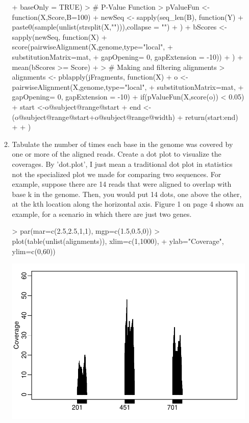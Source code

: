\documentclass[12pt,a4paper]{paper}
\begin{document}
\begin{enumerate}
\begin{enumerate}
\begin{Schunk}
\begin{Sinput}
+                                     baseOnly = TRUE)
> # P-Value Function
> pValueFun <- function(X,Score,B=100){
+   newSeq <- sapply(seq_len(B), function(Y){
+     paste0(sample(unlist(strsplit(X,""))),collapse = "")
+   })
+   bScores <- sapply(newSeq, function(X){
+     score(pairwiseAlignment(X,genome,type="local",
+                             substitutionMatrix=mat,
+                             gapOpening= 0, gapExtension = -10))
+   })
+   mean(bScores >= Score)
+ }
> # Making and filtering alignments
> alignments <- pblapply(jFragments, function(X){
+   o <- pairwiseAlignment(X,genome,type="local",
+                             substitutionMatrix=mat,
+                             gapOpening= 0, gapExtension = -10)
+   if(pValueFun(X,score(o)) < 0.05){
+     start <-o@subject@range@start
+     end <- (o@subject@range@start+o@subject@range@width)
+     return(start:end)
+   }
+ })
\end{Sinput}
\end{Schunk}
\item Tabulate the number of times each base in the genome was covered by one or more of
the aligned reads. Create a dot plot to visualize the coverages. By 'dot.plot', I just
mean a traditional dot plot in statistics not the specialized plot we made for comparing
two sequences. For example, suppose there are 14 reads that were aligned to overlap
with base k in the genome. Then, you would put 14 dots, one above the other, at the kth
location along the horizontal axis. Figure 1 on page 4 shows an example, for a scenario
in which there are just two genes.
\begin{Schunk}
\begin{Sinput}
> par(mar=c(2.5,2.5,1,1), mgp=c(1.5,0.5,0))
> plot(table(unlist(alignments)), xlim=c(1,1000), 
+      ylab="Coverage", ylim=c(0,60))
\end{Sinput}
\end{Schunk}
\includegraphics{Osorio_Daniel_HW5-005}

\end{enumerate}
\end{enumerate}
\end{document}
